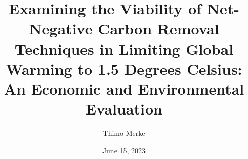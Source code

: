 \documentclass[12pt]{report}
\title{Examining the Viability of Net-Negative Carbon Removal Techniques in Limiting Global Warming to 1.5 Degrees Celsius: An Economic and Environmental Evaluation}
\author{Thimo Merke}
\date{June 15, 2023}
\begin{document}




\tableofcontents
\listoffigures
\listoftables
\newpage

\makenomenclature

\printnomenclature
\newpage

%






\appendix


\printbibliography


\end{document}
